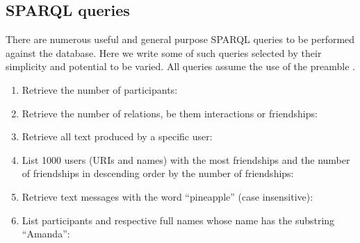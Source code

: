 \subsection{SPARQL queries}\label{queries}
There are numerous useful and general purpose SPARQL queries to be performed against the database.
Here we write some of such queries selected by their simplicity and potential to be varied.
All queries assume the use of the preamble .
\begin{enumerate}[leftmargin=0cm]
\item Retrieve the number of participants:\\
\item Retrieve the number of relations, be them interactions or
friendships:\\
\item Retrieve all text produced by a specific user:\\
\item List 1000 users (URIs and names) with the most friendships and the number of
friendships in descending order by the number of friendships:\\
\item Retrieve text messages with the word ``pineapple'' (case insensitive):\\
\item List participants and respective full names whose name has the substring ``Amanda'':\\

\end{enumerate}
